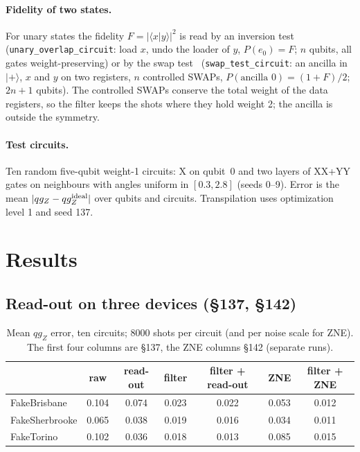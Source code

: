 \documentclass[11pt]{article}
\newcommand{\qZ}{qg_Z}
\begin{document}
\paragraph{Fidelity of two states.} For unary states the fidelity $F=|\langle x|y\rangle|^2$ is read by an
inversion test (\texttt{unary\_overlap\_circuit}: load $x$, undo the loader of $y$, $P(e_0)=F$; $n$ qubits, all
gates weight-preserving) or by the swap test~\cite{buhrman2001fingerprinting} (\texttt{swap\_test\_circuit}: an
ancilla in $|+\rangle$, $x$ and $y$ on two registers, $n$ controlled SWAPs, $P(\text{ancilla }0)=(1+F)/2$;
$2n+1$ qubits). The controlled SWAPs conserve the total weight of the data registers, so the filter keeps
the shots where they hold weight 2; the ancilla is outside the symmetry.

\paragraph{Test circuits.} Ten random five-qubit weight-1 circuits: X on qubit~0 and two layers of XX+YY
gates on neighbours with angles uniform in $[0.3,2.8]$ (seeds 0--9). Error is the mean
$|\qZ-\qZ^{\rm ideal}|$ over qubits and circuits. Transpilation uses optimization level 1 and seed 137.

\section{Results}

\subsection{Read-out on three devices (§137, §142)}

\begin{table}[h]
\centering\small
\begin{tabular}{lcccccc}
\toprule
 & raw & read-out & filter & filter + read-out & ZNE & filter + ZNE\\
\midrule
FakeBrisbane & 0.104 & 0.074 & 0.023 & 0.022 & 0.053 & 0.012\\
FakeSherbrooke & 0.065 & 0.038 & 0.019 & 0.016 & 0.034 & 0.011\\
FakeTorino & 0.102 & 0.036 & 0.018 & 0.013 & 0.085 & 0.015\\
\bottomrule
\end{tabular}
\caption{Mean $\qZ$ error, ten circuits; 8000 shots per circuit (and per noise scale for ZNE). The first four
columns are §137, the ZNE columns §142 (separate runs).}
\label{tab:three}
\end{table}
\end{document}

